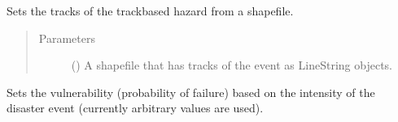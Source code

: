\documentclass[letterpaper,10pt,english]{sphinxmanual}
\begin{document}
\begin{fulllineitems}
\begin{fulllineitems}
\begin{quote}
\begin{description}
\end{description}\end{quote}

\end{fulllineitems}


\begin{fulllineitems}
\label{\detokenize{apidoc:dreaminsg_integrated_model.src.hazard_initiator.TrackDisruption.set_hazard_tracks_from_shapefile}}
\sphinxAtStartPar
Sets the tracks of the track\sphinxhyphen{}based hazard from a shapefile.
\begin{quote}\begin{description}
\item[{Parameters}] \leavevmode
\sphinxAtStartPar
{} () \textendash{} A shapefile that has tracks of the event as LineString objects.

\end{description}\end{quote}

\end{fulllineitems}


\begin{fulllineitems}
\label{\detokenize{apidoc:dreaminsg_integrated_model.src.hazard_initiator.TrackDisruption.set_intensity_failure_probability}}
\sphinxAtStartPar
Sets the vulnerability (probability of failure) based on the intensity of the disaster event (currently arbitrary values are used).

\end{fulllineitems}



\end{fulllineitems}
\end{document}
